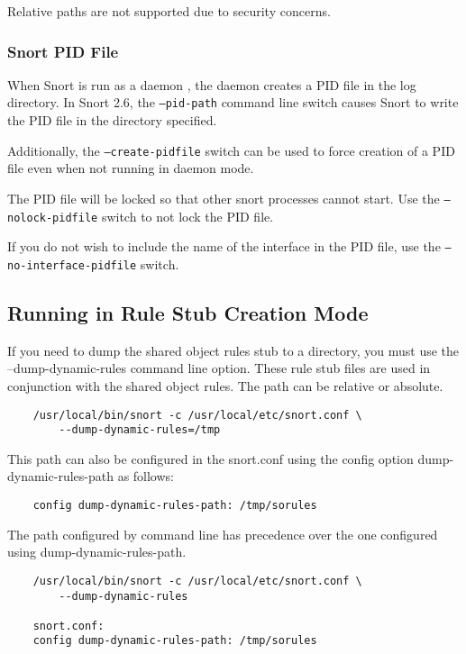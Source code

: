 \documentclass[english]{report}
\begin{document}
Relative paths are not supported due to security concerns.

\subsubsection{Snort PID File}

When Snort is run as a daemon , the daemon creates a PID file in the log
directory.  In Snort 2.6, the \texttt{--pid-path} command line switch causes
Snort to write the PID file in the directory specified.

Additionally, the \texttt{--create-pidfile} switch can be used to force
creation of a PID file even when not running in daemon mode.

The PID file will be locked so that other snort processes cannot start.  Use
the \texttt{--nolock-pidfile} switch to not lock the PID file.

If you do not wish to include the name of the interface in the PID file, use
the \texttt{--no-interface-pidfile} switch.

\subsection{Running in Rule Stub Creation Mode}

If you need to dump the shared object rules stub to a directory, you must use the --dump-dynamic-rules command line option. These rule stub files are used in conjunction with the shared object rules. The path can be relative or absolute. 

\begin{verbatim}
    /usr/local/bin/snort -c /usr/local/etc/snort.conf \
        --dump-dynamic-rules=/tmp
\end{verbatim}

This path can also be configured in the snort.conf using the config option dump-dynamic-rules-path as follows:

\begin{verbatim}
    config dump-dynamic-rules-path: /tmp/sorules
\end{verbatim}

The path configured by command line has precedence over the one configured using dump-dynamic-rules-path. 

\begin{verbatim}
    /usr/local/bin/snort -c /usr/local/etc/snort.conf \
        --dump-dynamic-rules

    snort.conf:
    config dump-dynamic-rules-path: /tmp/sorules
\end{verbatim}
\end{document}
